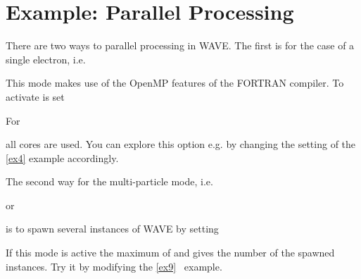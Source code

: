 \section{Example: Parallel Processing} \label{ex10}

There are two ways to parallel processing in WAVE. The first is for the
case of a single electron, i.e.


This mode makes use of the
OpenMP features of the FORTRAN compiler. To activate is set


For


all cores are used. You can explore this option e.g. by changing the
setting of the \ref{ex4} example accordingly.

The second way for the multi-particle mode, i.e.


or


is to spawn several instances of WAVE by setting


If this mode is active the maximum of  and
 gives the number of the spawned instances. Try
it by modifying the \ref{ex9}~ example.\\

